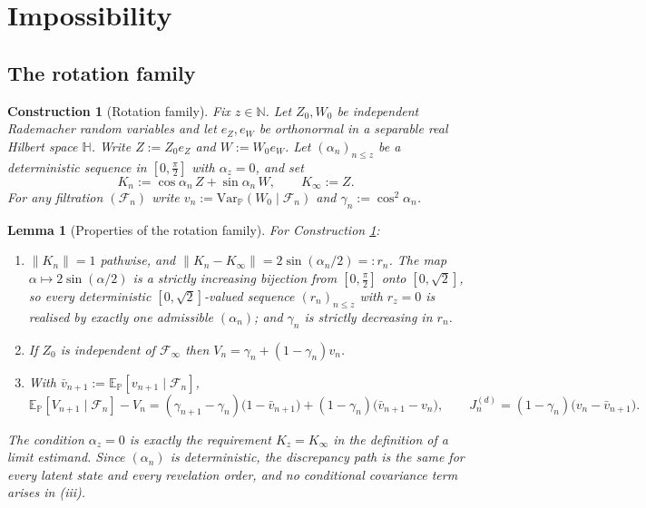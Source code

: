 \documentclass{article}
\newcommand{\Var}{\mathrm{Var}_{\mathbb{P}}}
\newcommand{\E}{\mathbb{E}_{\mathbb{P}}}
\newcommand{\F}{\mathcal{F}}
\newcommand{\1}{\mathbbm{1}}
\newtheorem{construction}{Construction}
\newtheorem{lemma}{Lemma}
\begin{document}
\section{Impossibility}

\subsection*{The rotation family}

\begin{construction}[Rotation family]
\label{rotation}
Fix $z\in\mathbb{N}$. Let $Z_0,W_0$ be independent Rademacher random variables and let $e_Z,e_W$
be orthonormal in a separable real Hilbert space $\mathbb{H}$. Write $Z:=Z_0e_Z$ and $W:=W_0e_W$.
Let $(\alpha_n)_{n\le z}$ be a deterministic sequence in $[0,\tfrac{\pi}{2}]$ with
$\alpha_z=0$, and set
\[
K_n:=\cos\alpha_n\,Z+\sin\alpha_n\,W,\qquad K_\infty:=Z .
\]
For any filtration $(\F_n)$ write $v_n:=\Var(W_0\mid\F_n)$ and
$\gamma_n:=\cos^2\!\alpha_n$.
\end{construction}

\begin{lemma}[Properties of the rotation family]
\label{rotprops}
For Construction \ref{rotation}:
\begin{enumerate}
\item[(i)] $\|K_n\|=1$ pathwise, and $\|K_n-K_\infty\|=2\sin(\alpha_n/2)=:r_n$. The map
$\alpha\mapsto2\sin(\alpha/2)$ is a strictly increasing bijection from $[0,\tfrac{\pi}{2}]$ onto
$[0,\sqrt2]$, so every deterministic $[0,\sqrt2]$-valued sequence $(r_n)_{n\le z}$ with $r_z=0$ is
realised by exactly one admissible $(\alpha_n)$; and $\gamma_n$ is strictly decreasing in $r_n$.
\item[(ii)] If $Z_0$ is independent of $\F_\infty$ then $V_n=\gamma_n+(1-\gamma_n)v_n$.
\item[(iii)] With $\bar v_{n+1}:=\E[v_{n+1}\mid\F_n]$,
\[
\E[V_{n+1}\mid\F_n]-V_n=(\gamma_{n+1}-\gamma_n)\big(1-\bar v_{n+1}\big)
+(1-\gamma_n)\big(\bar v_{n+1}-v_n\big),
\qquad
J^{(d)}_n=(1-\gamma_n)\big(v_n-\bar v_{n+1}\big).
\]
\end{enumerate}
The condition $\alpha_z=0$ is exactly the requirement $K_z=K_\infty$ in the definition of a limit
estimand. Since $(\alpha_n)$ is deterministic, the discrepancy path is the same for every latent
state and every revelation order, and no conditional covariance term arises in (iii).
\end{lemma}
\end{document}
